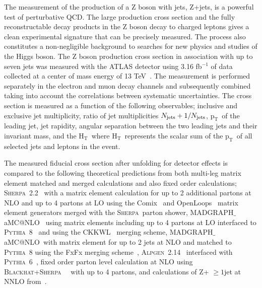 \documentclass[a4paper,11pt,notoc]{article}
\makeatletter
\newcommand{\pt}{\ensuremath{\mathrm{p_T}}}
\newcommand{\Ht}{\ensuremath{\mathrm{H_T}}}
\newcommand{\PYTHIA}{\textsc{Pythia}}
\newcommand{\SHERPA}{\textsc{Sherpa}}
\newcommand{\BLACKHAT}{\textsc{Blackhat}}
\newcommand{\ALPGEN}{\textsc{Alpgen}}
\newcommand{\MGNLO}{MADGRAPH$\_$aMC@NLO}
\makeatother
\begin{document}
The measurement of the production of a Z boson with jets, Z+jets, is a powerful test of perturbative QCD. The large production cross section and the fully reconstructable decay products in the Z boson decay to charged leptons gives a clean experimental signature that can be precisely measured. The process also constitutes a non-negligible background to searches for new physics and studies of the Higgs boson.
The Z boson production cross section in association with up to seven jets was measured with the ATLAS detector using 3.16 fb$^{-1}$ of data collected at a center of mass energy of 13 TeV~\cite{Aaboud:2017hbk}. The measurement is performed separately in the electron and muon decay channels and subsequently combined taking into account the correlations between systematic uncertainties. The cross section is measured as a function of the following observables; inclusive and exclusive jet multiplicity, ratio of jet multiplicities $N_{\rm jets}+1/N_{\rm jets}$, \pt\ of the leading jet, jet rapidity, angular separation between the two leading jets and their invariant mass, and the \Ht\, where \Ht\ represents the scalar sum of the \pt\ of all selected jets and leptons in the event. 

The measured fiducial cross section after unfolding for detector effects is compared to the following theoretical predictions from both multi-leg matrix element matched and merged calculations and also fixed order calculations; \SHERPA\ 2.2~\cite{Gleisberg:2008ta} with a matrix element calculation for up to 2 additional partons at NLO and up to 4 partons at LO using the Comix~\cite{Gleisberg:2008fv} and OpenLoops~\cite{Cascioli:2011va} matrix element generators merged with the \SHERPA\ parton shower, \MGNLO~\cite{Alwall:2014hca} using matrix elements including up to 4 partons at LO interfaced to \PYTHIA\ 8~\cite{Sjostrand:2007gs} and using the CKKWL~\cite{Lonnblad:2001iq} merging scheme, \MGNLO\ with matrix element for up to 2 jets at NLO and matched to \PYTHIA\ 8 using the FxFx merging scheme~\cite{Frederix:2012ps}, \ALPGEN\ 2.14~\cite{Mangano:2002ea} interfaced with \PYTHIA\ 6~\cite{Sjostrand:2006za}, fixed order parton level calculation at NLO using \BLACKHAT+\SHERPA~\cite{Berger:2010vm}~\cite{Ita:2011wn} with up to 4 partons, and calculations of Z+ $\ge 1$jet at NNLO from~\cite{Boughezal:2015dva}. 
\end{document}
